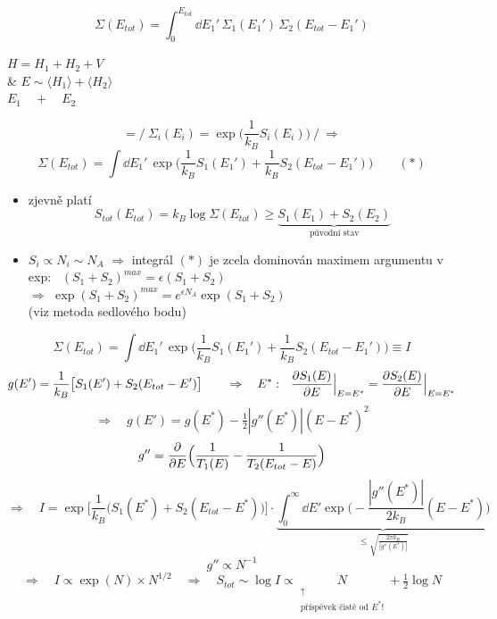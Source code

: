 \begin{minipage}{0.68\textwidth}
\[
  \Sigma(E_{tot}) = \int_0^{E_{tot}}\dd E_1'\,\Sigma_1(E_1')\,\Sigma_2(E_{tot} - E_1')
\]
\end{minipage}
\begin{minipage}{0.3\textwidth}
$H = H_1 + H_2 + V$ \\
\& $E\sim\langle H_1\rangle + \langle H_2\rangle$ \\
\hspace*{0.9cm}$E_1 \quad + \quad E_2$
\end{minipage}
\[
  = \Big/\ \Sigma_i(E_i) = \exp\Big(\frac{1}{k_B}S_i(E_i)\Big)\ \Big/ \ \Rightarrow
\]
\[
  \Sigma(E_{tot}) = \int\dd E_1'\,\exp\Big(\frac{1}{k_B}S_1(E_1') + \frac{1}{k_B}S_2(E_{tot} - E_1')\Big) \qquad (*)
\]

\begin{itemize}[label=$\to$]
  \item zjevně platí
  \[
    S_{tot}(E_{tot}) = k_B\log\Sigma(E_{tot}) \geq \underbrace{S_1(E_1) + S_2(E_2)}_{\text{původní stav}}
  \]
  \item $S_i\propto N_i\sim N_A$ $\Rightarrow$ integrál $(*)$ je zcela dominován maximem argumentu v exp: \ $(S_1 + S_2)^{max} = \epsilon(S_1 + S_2)$ \\
        $\Rightarrow$ \quad $\exp(S_1 + S_2)^{max} = e^{\epsilon N_A}\exp(S_1 + S_2)$ \\
        (viz metoda sedlového bodu)
\end{itemize}

{\color{NavyBlue}
\[
  \Sigma(E_{tot}) = \int\dd E_1'\,\exp\Big(\frac{1}{k_B}S_1(E_1') + \frac{1}{k_B}S_2(E_{tot} - E_1')\Big) \equiv I
\]
\[
  g(E') = \frac{1}{k_B}\big[S_1(E') + S_2(E_{tot} - E')\big]
  \qquad\Rightarrow\quad E^*:\ \ \pdv{S_1(E)}{E}\Big|_{E=E^*} = \pdv{S_2(E)}{E}\Big|_{E=E^*}
\]
\[
  \Rightarrow\quad g(E') = g(E^*) - \tfrac12|g''(E^*)|(E - E^*)^2
\]
\[
  g'' = \pdv{E}\Big(\frac{1}{T_1(E)} - \frac{1}{T_2(E_{tot} - E)}\Big)
\]
\[
  \Rightarrow\quad I = \exp\Big[\frac{1}{k_B}\big(S_1(E^*) + S_2(E_{tot} - E^*)\big)\Big]\cdot
  \underbrace{\int_0^\infty\dd E'\exp\Big(-\frac{|g''(E^*)|}{2k_B}(E - E^*)\Big)}_{\leq\sqrt{\frac{2\pi k_B}{|g''(E^*)|}}}
\]
\[
  g''\propto N^{-1}
\]
\[
  \Rightarrow\quad I\propto\exp(N)\times N^{1/2}
  \quad\Rightarrow\quad S_{tot}\sim\log I \propto \underset{\substack{\uparrow\\ \text{příspěvek čistě od } E^*!}}{N} + \tfrac12\log N
\]
}

